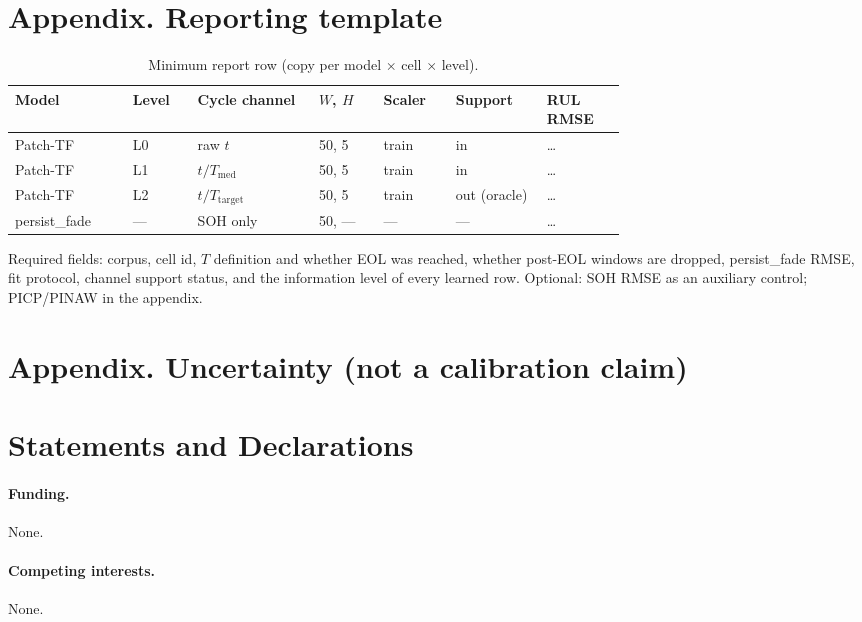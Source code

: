 \section*{Appendix. Reporting template}

\begin{table}[htbp]
\centering
\footnotesize
\setlength{\tabcolsep}{3pt}
\caption{Minimum report row (copy per model $\times$ cell $\times$ level).}
\label{tab:template}
\begin{tabular}{@{}p{0.14\linewidth}p{0.07\linewidth}p{0.15\linewidth}p{0.08\linewidth}p{0.08\linewidth}p{0.10\linewidth}p{0.09\linewidth}@{}}
\toprule
Model & Level & Cycle channel & $W$, $H$ & Scaler & Support & RUL RMSE \\
\midrule
Patch-TF & L0 & raw $t$ & 50, 5 & train & in & \ldots \\
Patch-TF & L1 & $t/T_{\mathrm{med}}$ & 50, 5 & train & in & \ldots \\
Patch-TF & L2 & $t/T_{\mathrm{target}}$ & 50, 5 & train & out (oracle) & \ldots \\
persist\_fade & --- & SOH only & 50, --- & --- & --- & \ldots \\
\bottomrule
\end{tabular}
\end{table}

Required fields: corpus, cell id, $T$ definition and whether EOL was reached, whether post-EOL windows are dropped, persist\_fade RMSE, fit protocol, channel support status, and the information level of every learned row.
Optional: SOH RMSE as an auxiliary control; PICP/PINAW in the appendix.

\section*{Appendix. Uncertainty (not a calibration claim)}


\section*{Statements and Declarations}
\paragraph{Funding.} None.
\paragraph{Competing interests.} None.
